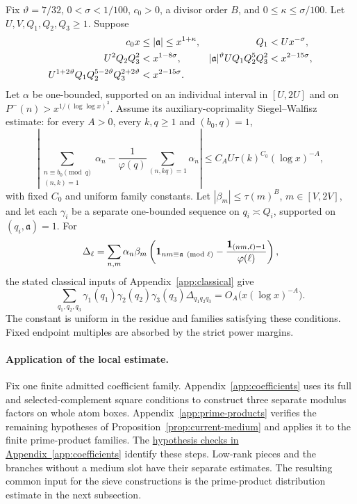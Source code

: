 \begin{proposition}
\label{prop:current-medium}
Fix $\vartheta=7/32$, $0<\sigma<1/100$, $c_0>0$, a divisor order
$B$, and $0\le\kappa\le\sigma/100$. Let $U,V,Q_1,Q_2,Q_3\ge1$. Suppose
\begin{align}
 c_0x&\le |\mathfrak a|\le x^{1+\kappa},&
 Q_1&<Ux^{-\sigma}, \notag\\
 U^2Q_2Q_3^2&<x^{1-8\sigma},&
 |\mathfrak a|^{\vartheta}UQ_1Q_2^5Q_3^2&<x^{2-15\sigma},
       \label{eq:current-medium-ranges}\\
 U^{1+2\vartheta}Q_1Q_2^{5-2\vartheta}Q_3^{2+2\vartheta}
      &<x^{2-15\sigma}.&&\notag
\end{align}
Let $\alpha$ be one-bounded, supported on an individual interval in
$[U,2U]$ and on
$P^-(n)>x^{1/(\log\log x)^3}$.  Assume its auxiliary-coprimality
Siegel--Walfisz estimate: for every $A>0$, every $k,q\ge1$ and
$(b_0,q)=1$,
\begin{equation}
 \left|\sum_{\substack{n\equiv b_0\pmod q\\(n,k)=1}}\alpha_n
 -\frac1{\varphi(q)}\sum_{(n,kq)=1}\alpha_n\right|
 \le C_AU\tau(k)^{C_0}(\log x)^{-A},
 \label{eq:current-aux-sw}
\end{equation}
with fixed $C_0$ and uniform family constants.  Let
$|\beta_m|\le\tau(m)^B$, $m\in[V,2V]$, and let each $\gamma_i$ be a
separate one-bounded sequence on $q_i\asymp Q_i$, supported on
$(q_i,\mathfrak a)=1$.  For
\[
 \Delta_{\ell}=\sum_{n,m}\alpha_n\beta_m
 \left({\mathbf 1}_{nm\equiv\mathfrak a\pmod \ell}
       -\frac{{\mathbf 1}_{(nm,\ell)=1}}{\varphi(\ell)}\right),
\]
the stated classical inputs of Appendix~\ref{app:classical} give
\begin{equation}
 \sum_{q_1,q_2,q_3}\gamma_1(q_1)\gamma_2(q_2)\gamma_3(q_3)
                    \Delta_{q_1q_2q_3}
       =O_A\bigl(x(\log x)^{-A}\bigr).
 \label{eq:current-medium-conclusion}
\end{equation}
The constant is uniform in the residue and families satisfying these
conditions.  Fixed endpoint multiples are absorbed by the strict
power margins.
\end{proposition}

\paragraph{Application of the local estimate.}
Fix one finite admitted coefficient family. Appendix~\ref{app:coefficients}
uses its full and selected-complement square conditions to construct three
separate modulus factors on whole atom boxes. Appendix~\ref{app:prime-products}
verifies the remaining hypotheses of Proposition~\ref{prop:current-medium}
and applies it to the finite prime-product families. The
\hyperlink{coef:medium-checks}{hypothesis checks in Appendix~\ref{app:coefficients}}
identify these steps. Low-rank pieces and the branches without a medium slot
have their separate estimates. The resulting common input for the sieve
constructions is the prime-product distribution estimate in the next subsection.

